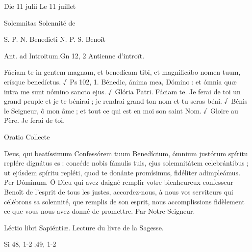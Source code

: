 \begin{paracol}{2}
Die 11 julii
\switchcolumn
Le 11 juillet
\switchcolumn*

Solemnitas
\switchcolumn
Solennité de
\switchcolumn*

S. P. N. Benedicti
\switchcolumn
N. P. S. Benoît
\switchcolumn*

Ant. ad Introitum.\hfill Gn 12, 2
\switchcolumn
Antienne d’introït.
\switchcolumn*

Fáciam te in gentem magnam, et  benedícam tibi, et magnificábo nomen tuum, erísque benedíctus. √~Ps 102, 1. Bénedic, ánima mea, Dómino : et ómnia quæ intra me sunt nómino sancto ejus. √~Glória Patri. Fáciam te.
\switchcolumn
Je ferai de toi un grand peuple et je te  bénirai ; je rendrai grand ton nom et tu seras béni. √~Bénis le Seigneur, ô mon âme ; et tout ce qui est en moi son saint Nom. √~Gloire au Père. Je ferai de toi.
\switchcolumn*

Oratio
\switchcolumn
Collecte
\switchcolumn*

Deus, qui beatíssimum  Confessórem tuum Benedíctum, ómnium justórum spíritu replére dignátus es : concéde nobis fámulis tuis, ejus solemnitátem celebrántibus ; ut ejúsdem spíritu repléti, quod te donánte promísimus, fidéliter adimpleámus. Per Dóminum.
\switchcolumn
Ô Dieu qui avez daigné remplir votre  bienheureux confesseur Benoît de l’esprit de tous les justes, accordez-nous, à nous vos serviteurs qui célébrons sa solennité, que remplis de son esprit, nous accomplissions fidèlement ce que vous nous avez donné de promettre. Par Notre-Seigneur.
\switchcolumn*

Léctio libri Sapiéntiæ.
\switchcolumn
Lecture du livre de la Sagesse.
\switchcolumn*

Si 48, 1-2 ;49, 1-2
\switchcolumn

\switchcolumn*


\end{paracol}
